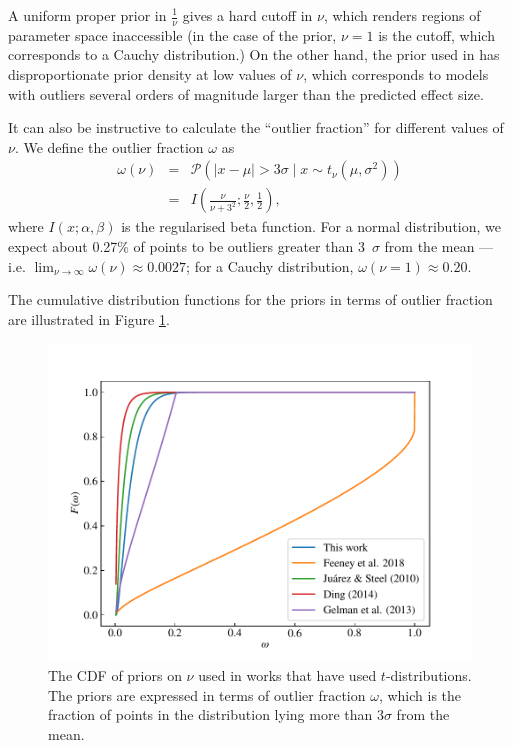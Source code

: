 \documentclass[fleqn,usenatbib]{mnras}
\begin{document}
A uniform proper prior in $\frac1\nu$ gives a hard cutoff in $\nu$, which
renders regions of parameter space inaccessible (in the case of the
\citet{Gelman:2013} prior, $\nu = 1$ is the cutoff, which corresponds to a
Cauchy distribution.) On the other hand, the prior used in \citet{Feeney:2018}
has disproportionate prior density at low values of $\nu$, which corresponds to
models with outliers several orders of magnitude larger than the predicted
effect size.

It can also be instructive to calculate the ``outlier fraction'' for different
values of $\nu$. We define the outlier fraction $\omega$ as
\begin{eqnarray}
    \omega(\nu) &=& \mathcal P\left(|x - \mu| > 3 \sigma \mid x \sim t_\nu (\mu, \sigma^2) \right) \\
    &=& I\left(\frac{\nu}{\nu + 3^2};\frac\nu2, \frac12\right),
\end{eqnarray}
where $I(x; \alpha, \beta)$ is the regularised beta function. For a normal
distribution, we expect about 0.27\% of points to be outliers greater than
3~$\sigma$ from the mean --- i.e. $\lim_{\nu \rightarrow \infty}\omega(\nu)
\approx 0.0027$; for a Cauchy distribution, $\omega(\nu = 1) \approx 0.20$.

The cumulative distribution functions for the priors in terms of outlier
fraction are illustrated in Figure \ref{fig:priors.outlier_frac}.
\begin{figure}
	\includegraphics[width=\columnwidth]{graphics/cdf_outlier_frac}
    \caption{The CDF of priors on $\nu$ used in works that have used
    $t$-distributions. The priors are expressed in terms of outlier fraction
    $\omega$, which is the fraction of points in the distribution lying more
    than 3$\sigma$ from the mean.}
    \label{fig:priors.outlier_frac}
\end{figure}
\end{document}
